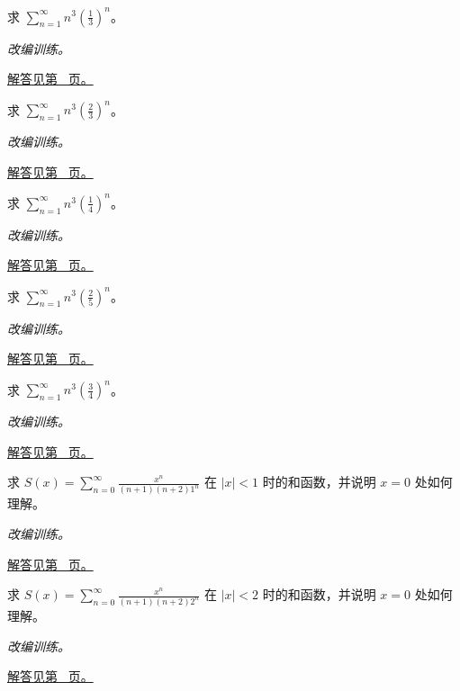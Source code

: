 \documentclass[UTF8,12pt,a4paper,fontset=fandol]{ctexart}
\begin{document}
\begin{example}[立方系数的几何和]\label{ex:c27q8}
求 $\displaystyle\sum_{n=1}^\infty n^3(\frac{1}{3})^n$。
\par\textit{改编训练。}\par\hyperref[ans:c27q8]{解答见第~\pageref{ans:c27q8} 页。}
\end{example}
\begin{example}[立方系数的几何和]\label{ex:c27q9}
求 $\displaystyle\sum_{n=1}^\infty n^3(\frac{2}{3})^n$。
\par\textit{改编训练。}\par\hyperref[ans:c27q9]{解答见第~\pageref{ans:c27q9} 页。}
\end{example}
\begin{example}[立方系数的几何和]\label{ex:c27q10}
求 $\displaystyle\sum_{n=1}^\infty n^3(\frac{1}{4})^n$。
\par\textit{改编训练。}\par\hyperref[ans:c27q10]{解答见第~\pageref{ans:c27q10} 页。}
\end{example}
\begin{example}[立方系数的几何和]\label{ex:c27q11}
求 $\displaystyle\sum_{n=1}^\infty n^3(\frac{2}{5})^n$。
\par\textit{改编训练。}\par\hyperref[ans:c27q11]{解答见第~\pageref{ans:c27q11} 页。}
\end{example}
\begin{example}[立方系数的几何和]\label{ex:c27q12}
求 $\displaystyle\sum_{n=1}^\infty n^3(\frac{3}{4})^n$。
\par\textit{改编训练。}\par\hyperref[ans:c27q12]{解答见第~\pageref{ans:c27q12} 页。}
\end{example}
\begin{example}[两次积分产生的系数]\label{ex:c27q13}
求 $S(x)=\displaystyle\sum_{n=0}^\infty\frac{x^n}{(n+1)(n+2)1^n}$ 在 $|x|<1$ 时的和函数，并说明 $x=0$ 处如何理解。
\par\textit{改编训练。}\par\hyperref[ans:c27q13]{解答见第~\pageref{ans:c27q13} 页。}
\end{example}
\begin{example}[两次积分产生的系数]\label{ex:c27q14}
求 $S(x)=\displaystyle\sum_{n=0}^\infty\frac{x^n}{(n+1)(n+2)2^n}$ 在 $|x|<2$ 时的和函数，并说明 $x=0$ 处如何理解。
\par\textit{改编训练。}\par\hyperref[ans:c27q14]{解答见第~\pageref{ans:c27q14} 页。}
\end{example}
\end{document}
